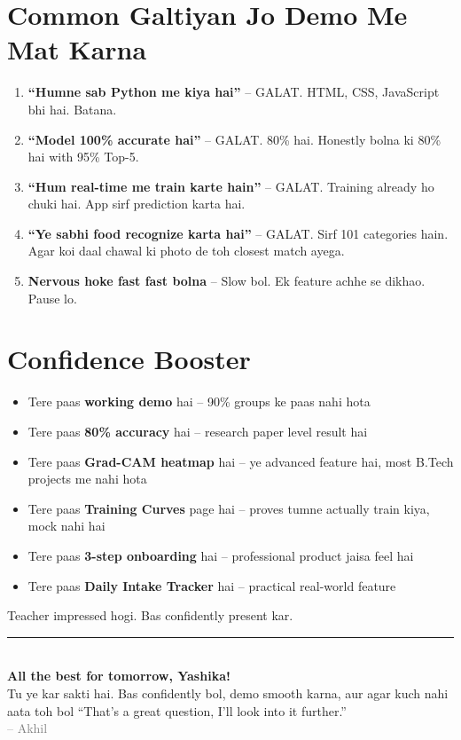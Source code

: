 \documentclass[11pt,a4paper]{article}
\begin{document}
\section{Common Galtiyan Jo Demo Me Mat Karna}

\begin{enumerate}[leftmargin=1.2cm]
\item \textbf{``Humne sab Python me kiya hai''} -- GALAT. HTML, CSS, JavaScript bhi hai. Batana.
\item \textbf{``Model 100\% accurate hai''} -- GALAT. 80\% hai. Honestly bolna ki 80\% hai with 95\% Top-5.
\item \textbf{``Hum real-time me train karte hain''} -- GALAT. Training already ho chuki hai. App sirf prediction karta hai.
\item \textbf{``Ye sabhi food recognize karta hai''} -- GALAT. Sirf 101 categories hain. Agar koi daal chawal ki photo de toh closest match ayega.
\item \textbf{Nervous hoke fast fast bolna} -- Slow bol. Ek feature achhe se dikhao. Pause lo.
\end{enumerate}

\section{Confidence Booster}

\begin{itemize}[leftmargin=1.2cm]
\item Tere paas \textbf{working demo} hai -- 90\% groups ke paas nahi hota
\item Tere paas \textbf{80\% accuracy} hai -- research paper level result hai
\item Tere paas \textbf{Grad-CAM heatmap} hai -- ye advanced feature hai, most B.Tech projects me nahi hota
\item Tere paas \textbf{Training Curves} page hai -- proves tumne actually train kiya, mock nahi hai
\item Tere paas \textbf{3-step onboarding} hai -- professional product jaisa feel hai
\item Tere paas \textbf{Daily Intake Tracker} hai -- practical real-world feature
\end{itemize}

Teacher impressed hogi. Bas confidently present kar.

\vspace{0.8cm}
\begin{center}
\rule{0.5\textwidth}{0.4pt}\\[0.3cm]
{\large \textbf{All the best for tomorrow, Yashika!}}\\[0.15cm]
{\normalsize Tu ye kar sakti hai. Bas confidently bol, demo smooth karna, aur agar kuch nahi aata toh bol ``That's a great question, I'll look into it further.'' }\\[0.15cm]
{\small \textcolor{gray}{-- Akhil}}
\end{center}
\end{document}
